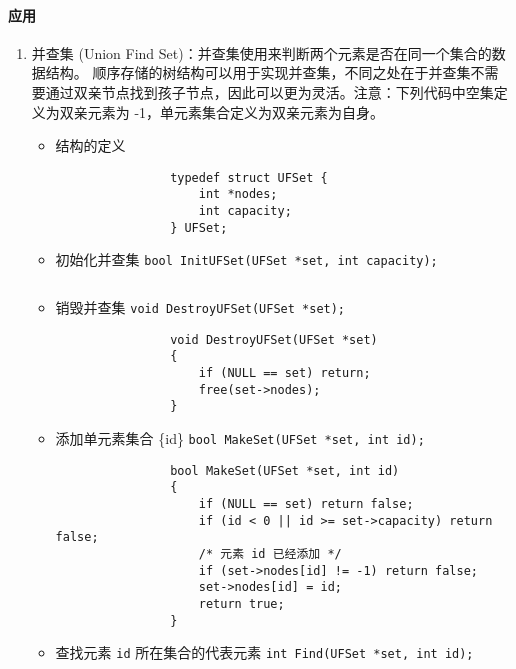 \documentclass{ctexart}
\begin{document}
\paragraph{应用}
\begin{enumerate}
    \item 并查集 (Union Find Set)：并查集使用来判断两个元素是否在同一个集合的数据结构。
        顺序存储的树结构可以用于实现并查集，不同之处在于并查集不需要通过双亲节点找到孩子节点，因此可以更为灵活。注意：下列代码中空集定义为双亲元素为 -1，单元素集合定义为双亲元素为自身。
        \begin{itemize}
            \item 结构的定义
                \begin{verbatim}
                typedef struct UFSet {
                    int *nodes;
                    int capacity;
                } UFSet;
                \end{verbatim}

            \item 初始化并查集 \texttt{bool InitUFSet(UFSet *set, int capacity);}
                \inputminted{c}{codes/init-ufset.c}

            \item 销毁并查集 \texttt{void DestroyUFSet(UFSet *set);}
                \begin{verbatim}
                void DestroyUFSet(UFSet *set)
                {
                    if (NULL == set) return;
                    free(set->nodes);
                }
                \end{verbatim}

            \item 添加单元素集合 \{id\} \texttt{bool MakeSet(UFSet *set, int id);}
                \begin{verbatim}
                bool MakeSet(UFSet *set, int id)
                {
                    if (NULL == set) return false;
                    if (id < 0 || id >= set->capacity) return false;
                    /* 元素 id 已经添加 */
                    if (set->nodes[id] != -1) return false;
                    set->nodes[id] = id;
                    return true;
                }
                \end{verbatim}

            \item 查找元素 \texttt{id} 所在集合的代表元素 \texttt{int Find(UFSet *set, int id);}
                \inputminted{c}{codes/ufset-find.c}


\end{itemize}
\end{enumerate}
\end{document}

